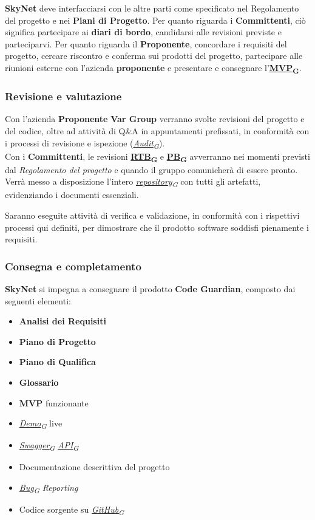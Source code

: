 \documentclass[12pt, a4paper]{article}
\newcommand{\urlglossario}{https://skynetunigroup.github.io/Code_Guardian/Documentazione/RTB/glossario_v1.0.0.pdf} %
\newcommand{\glo}[2]{\href{\urlglossario\#nameddest=#2}{#1\textsubscript{G}}}
\begin{document}
\textbf{SkyNet} deve interfacciarsi con le altre parti come specificato nel Regolamento del progetto e nei \textbf{Piani di Progetto}. Per quanto riguarda i \textbf{Committenti}, ciò significa partecipare ai \textbf{diari di bordo}, candidarsi alle revisioni previste e parteciparvi. Per quanto riguarda il \textbf{Proponente}, concordare i requisiti del progetto, cercare riscontro e conferma sui prodotti del progetto, partecipare alle riunioni esterne con l'azienda \textbf{proponente} e presentare e consegnare l'\textbf{\glo{MVP}{mvp}}.

\subsubsection{Revisione e valutazione}
Con l'azienda \textbf{Proponente} \textbf{Var Group} verranno svolte revisioni del progetto e del codice, oltre ad attività di Q\&A in appuntamenti prefissati, in conformità con i processi di revisione e ispezione (\textit{\glo{Audit}{audit}}).\\
Con i \textbf{Committenti}, le revisioni \textbf{\glo{RTB}{rtb}} e \textbf{\glo{PB}{pb}} avverranno nei momenti previsti dal \textit{Regolamento del progetto} e quando il gruppo comunicherà di essere pronto. Verrà messo a disposizione l'intero \textit{\glo{repository}{repository}} con tutti gli artefatti, evidenziando i documenti essenziali.

Saranno eseguite attività di verifica e validazione, in conformità con i rispettivi processi qui definiti, per dimostrare che il prodotto software soddisfi pienamente i requisiti.

\subsubsection{Consegna e completamento}
\textbf{SkyNet} si impegna a consegnare il prodotto \textbf{Code Guardian}, composto dai seguenti elementi:

\begin{itemize}
    \item \textbf{Analisi dei Requisiti}
    \item \textbf{Piano di Progetto}
    \item \textbf{Piano di Qualifica}
    \item \textbf{Glossario}
    \item \textbf{MVP} funzionante
    \item \textit{\glo{\textit{Demo}}{demo}} live
    \item \textit{\glo{Swagger}{swagger}} \textit{\glo{API}{api}}
    \item Documentazione descrittiva del progetto
    \item \textit{\glo{Bug}{bug} Reporting}
    \item Codice sorgente su \textit{\glo{GitHub}{github}}
\end{itemize}
\end{document}
